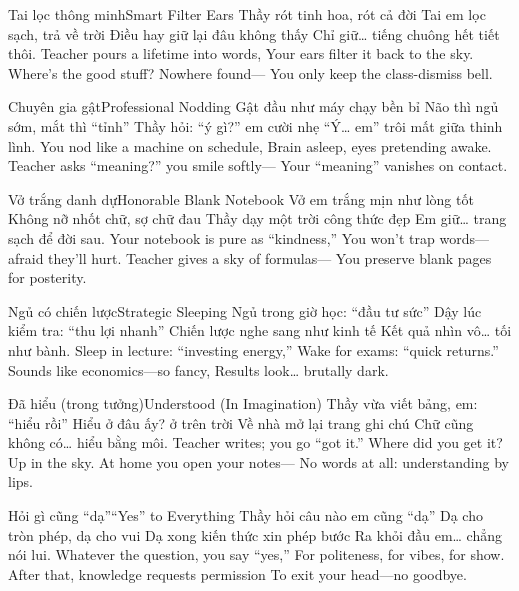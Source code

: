 
\begin{tutuyetbox}{Tai lọc thông minh}{Smart Filter Ears}
Thầy rót tinh hoa, rót cả đời
Tai em lọc sạch, trả về trời
Điều hay giữ lại đâu không thấy
Chỉ giữ… tiếng chuông hết tiết thôi.
\tcblower
Teacher pours a lifetime into words,
Your ears filter it back to the sky.
Where’s the good stuff? Nowhere found—
You only keep the class-dismiss bell.
\end{tutuyetbox}

\begin{tutuyetbox}{Chuyên gia gật}{Professional Nodding}
Gật đầu như máy chạy bền bỉ
Não thì ngủ sớm, mắt thì “tỉnh”
Thầy hỏi: “ý gì?” em cười nhẹ
“Ý… em” trôi mất giữa thinh lình.
\tcblower
You nod like a machine on schedule,
Brain asleep, eyes pretending awake.
Teacher asks “meaning?” you smile softly—
Your “meaning” vanishes on contact.
\end{tutuyetbox}

\begin{tutuyetbox}{Vở trắng danh dự}{Honorable Blank Notebook}
Vở em trắng mịn như lòng tốt
Không nỡ nhốt chữ, sợ chữ đau
Thầy dạy một trời công thức đẹp
Em giữ… trang sạch để đời sau.
\tcblower
Your notebook is pure as “kindness,”
You won’t trap words—afraid they’ll hurt.
Teacher gives a sky of formulas—
You preserve blank pages for posterity.
\end{tutuyetbox}

\begin{tutuyetbox}{Ngủ có chiến lược}{Strategic Sleeping}
Ngủ trong giờ học: “đầu tư sức”
Dậy lúc kiểm tra: “thu lợi nhanh”
Chiến lược nghe sang như kinh tế
Kết quả nhìn vô… tối như bành.
\tcblower
Sleep in lecture: “investing energy,”
Wake for exams: “quick returns.”
Sounds like economics—so fancy,
Results look… brutally dark.
\end{tutuyetbox}

\begin{tutuyetbox}{Đã hiểu (trong tưởng)}{Understood (In Imagination)}
Thầy vừa viết bảng, em: “hiểu rồi”
Hiểu ở đâu ấy? ở trên trời
Về nhà mở lại trang ghi chú
Chữ cũng không có… hiểu bằng môi.
\tcblower
Teacher writes; you go “got it.”
Where did you get it? Up in the sky.
At home you open your notes—
No words at all: understanding by lips.
\end{tutuyetbox}

\begin{tutuyetbox}{Hỏi gì cũng “dạ”}{“Yes” to Everything}
Thầy hỏi câu nào em cũng “dạ”
Dạ cho tròn phép, dạ cho vui
Dạ xong kiến thức xin phép bước
Ra khỏi đầu em… chẳng nói lui.
\tcblower
Whatever the question, you say “yes,”
For politeness, for vibes, for show.
After that, knowledge requests permission
To exit your head—no goodbye.
\end{tutuyetbox}

